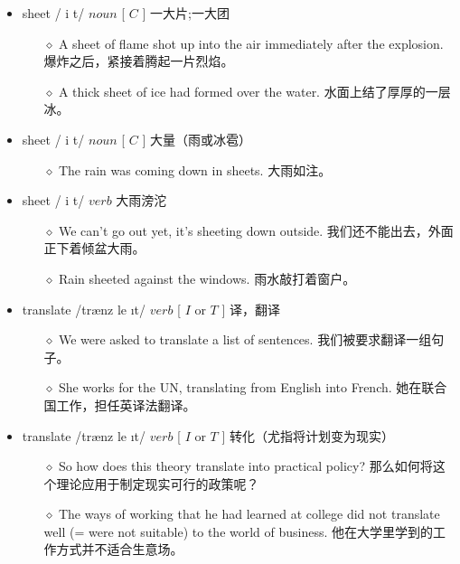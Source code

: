 \documentclass[a4paper,top=2.5cm,buttom=2.5cm10.5pt]{book}
\begin{document}
\begin{itemize}
\item sheet / \textesh i \textlengthmark t/ $ noun $ [  $ C $  ] 一大片;一大团
\begin{itemize}
\item[$\diamond$] A sheet of flame shot up into the air immediately after the explosion.
爆炸之后，紧接着腾起一片烈焰。
\item[$\diamond$] A thick sheet of ice had formed over the water.
水面上结了厚厚的一层冰。
\end{itemize}
\end{itemize}
\begin{itemize}
\item sheet / \textesh i \textlengthmark t/ $ noun $ [  $ C $  ] 大量（雨或冰雹）
\begin{itemize}
\item[$\diamond$] The rain was coming down in sheets.
大雨如注。
\end{itemize}
\end{itemize}
\begin{itemize}
\item sheet / \textesh i \textlengthmark t/ $ verb $  大雨滂沱
\begin{itemize}
\item[$\diamond$] We can't go out yet, it's sheeting down outside.
我们还不能出去，外面正下着倾盆大雨。
\item[$\diamond$] Rain sheeted against the windows.
雨水敲打着窗户。
\end{itemize}
\end{itemize}
\begin{itemize}
\item translate /trænz \textprimstress le \i t/ $ verb $ [  $ I $  or  $ T $  ] 译，翻译
\begin{itemize}
\item[$\diamond$] We were asked to translate a list of sentences.
我们被要求翻译一组句子。
\item[$\diamond$] She works for the UN, translating from English into French.
她在联合国工作，担任英译法翻译。
\end{itemize}
\end{itemize}
\begin{itemize}
\item translate /trænz \textprimstress le \i t/ $ verb $ [  $ I $  or  $ T $  ] 转化（尤指将计划变为现实）
\begin{itemize}
\item[$\diamond$] So how does this theory translate into practical policy?
那么如何将这个理论应用于制定现实可行的政策呢？
\item[$\diamond$] The ways of working that he had learned at college did not translate well (= were not suitable) to the world of business.
他在大学里学到的工作方式并不适合生意场。
\end{itemize}
\end{itemize}
\end{document}
